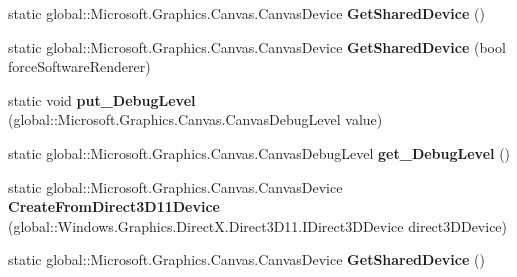 \begin{DoxyCompactItemize}
\item 
\mbox{\label{class_microsoft_1_1_graphics_1_1_canvas_1_1_canvas_device_a773190aa560cbf1b1dc04ae5b544481f}} 
static global\+::\+Microsoft.\+Graphics.\+Canvas.\+Canvas\+Device {\bfseries Get\+Shared\+Device} ()
\item 
\mbox{\label{class_microsoft_1_1_graphics_1_1_canvas_1_1_canvas_device_acb468348f5f4cc3993e0cda3133a3756}} 
static global\+::\+Microsoft.\+Graphics.\+Canvas.\+Canvas\+Device {\bfseries Get\+Shared\+Device} (bool force\+Software\+Renderer)
\item 
\mbox{\label{class_microsoft_1_1_graphics_1_1_canvas_1_1_canvas_device_ab9c64c019ceb46a0ce7750c7672266bf}} 
static void {\bfseries put\+\_\+\+Debug\+Level} (global\+::\+Microsoft.\+Graphics.\+Canvas.\+Canvas\+Debug\+Level value)
\item 
\mbox{\label{class_microsoft_1_1_graphics_1_1_canvas_1_1_canvas_device_ab81e13bacbccaa108210dc500f9f64fd}} 
static global\+::\+Microsoft.\+Graphics.\+Canvas.\+Canvas\+Debug\+Level {\bfseries get\+\_\+\+Debug\+Level} ()
\item 
\mbox{\label{class_microsoft_1_1_graphics_1_1_canvas_1_1_canvas_device_ac34f7ec06b15bc5f366d17073c7a044b}} 
static global\+::\+Microsoft.\+Graphics.\+Canvas.\+Canvas\+Device {\bfseries Create\+From\+Direct3\+D11\+Device} (global\+::\+Windows.\+Graphics.\+Direct\+X.\+Direct3\+D11.\+I\+Direct3\+D\+Device direct3\+D\+Device)
\item 
\mbox{\label{class_microsoft_1_1_graphics_1_1_canvas_1_1_canvas_device_a773190aa560cbf1b1dc04ae5b544481f}} 
static global\+::\+Microsoft.\+Graphics.\+Canvas.\+Canvas\+Device {\bfseries Get\+Shared\+Device} ()
\item 
\mbox{\label{class_microsoft_1_1_graphics_1_1_canvas_1_1_canvas_device_acb468348f5f4cc3993e0cda3133a3756}} 

\end{DoxyCompactItemize}
